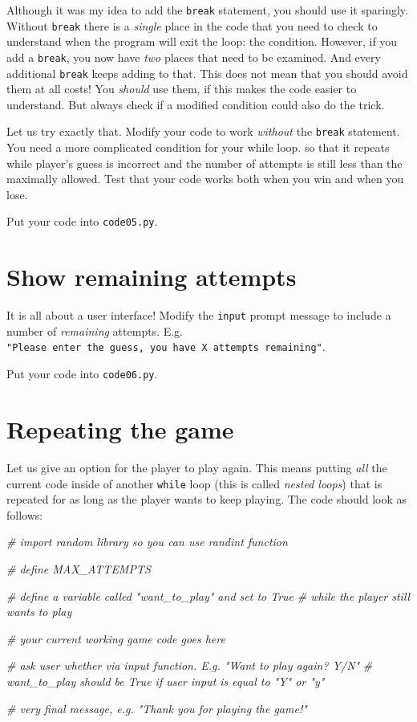 \documentclass[
]{book}
\newenvironment{Shaded}{\begin{snugshade}}{\end{snugshade}}
\newcommand{\CommentTok}[1]{\textcolor[rgb]{0.56,0.35,0.01}{\textit{#1}}}
\begin{document}
Although it was my idea to add the \texttt{break} statement, you should use it sparingly. Without \texttt{break} there is a \emph{single} place in the code that you need to check to understand when the program will exit the loop: the condition. However, if you add a \texttt{break}, you now have \emph{two} places that need to be examined. And every additional \texttt{break} keeps adding to that. This does not mean that you should avoid them at all costs! You \emph{should} use them, if this makes the code easier to understand. But always check if a modified condition could also do the trick.

Let us try exactly that. Modify your code to work \emph{without} the \texttt{break} statement. You need a more complicated condition for your while loop. so that it repeats while player's guess is incorrect and the number of attempts is still less than the maximally allowed. Test that your code works both when you win and when you lose.

Put your code into \texttt{code05.py}.

\hypertarget{show-remaining-attempts}{%
\section{Show remaining attempts}\label{show-remaining-attempts}}

It is all about a user interface! Modify the \texttt{input} prompt message to include a number of \emph{remaining} attempts. E.g. \texttt{"Please\ enter\ the\ guess,\ you\ have\ X\ attempts\ remaining"}.

Put your code into \texttt{code06.py}.

\hypertarget{guess-the-number-repeat-game}{%
\section{Repeating the game}\label{guess-the-number-repeat-game}}

Let us give an option for the player to play again. This means putting \emph{all} the current code inside of another \texttt{while} loop (this is called \emph{nested loops}) that is repeated for as long as the player wants to keep playing. The code should look as follows:

\begin{Shaded}
\begin{Highlighting}[]
\CommentTok{\# import random library so you can use randint function}

\CommentTok{\# define MAX\_ATTEMPTS}

\CommentTok{\# define a variable called "want\_to\_play" and set to True}
\CommentTok{\# while the player still wants to play}
  
  \CommentTok{\# your current working game code goes here}
  
  \CommentTok{\# ask user whether via input function. E.g. "Want to play again? Y/N"}
  \CommentTok{\# want\_to\_play should be True if user input is equal to "Y" or "y"}
  
\CommentTok{\# very final message, e.g. "Thank you for playing the game!"}
\end{Highlighting}
\end{Shaded}
\end{document}
